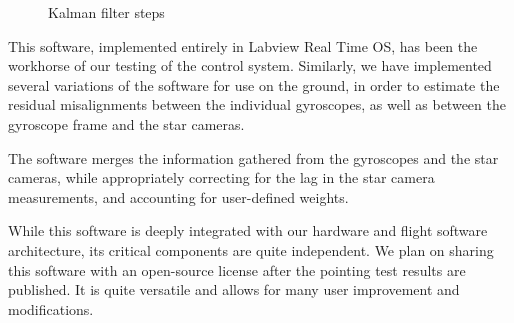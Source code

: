 \begin{figure}[!h]
	\centering
	
\caption{Kalman filter steps}
\label{fig:kalmanFilterSteps}
\end{figure}

This software, implemented entirely in Labview Real Time OS, has been the workhorse of our testing of the control system. Similarly, we have implemented several variations of the software for use on the ground, in order to estimate the residual misalignments between the individual gyroscopes, as well as between the gyroscope frame and the star cameras.

The software merges the information gathered from the gyroscopes and the star cameras, while appropriately correcting for the lag in the star camera measurements, and accounting for user-defined weights. 

While this software is deeply integrated with our hardware and flight software architecture, its critical components are quite independent. We plan on sharing this software with an open-source license after the pointing test results are published. It is quite versatile and allows for many user improvement and modifications.